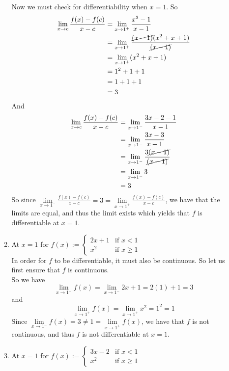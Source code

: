 \documentclass[12pt,letterpaper]{article}
\theoremstyle{case}
\theoremstyle{definition}
\begin{document}
\begin{enumerate}
\begin{enumerate}
			Now we must check for differentiability when $x=1$. So
			\begin{align*}
				\lim\limits_{x \to c} \frac{f(x)-f(c)}{x-c} &= \lim\limits_{x \to 1^+} \frac{x^3-1}{x-1} \\
				&= \lim\limits_{x \to 1^+} \frac{\cancel{(x-1)}(x^2+x+1)}{\cancel{(x-1)}} \\
				&= \lim\limits_{x \to 1^+} (x^2+x+1) \\
				&= 1^2+1+1 \\
				&= 1 + 1 + 1 \\
				&= 3
			\end{align*}
			And
			\begin{align*}
				\lim\limits_{x \to c} \frac{f(x)-f(c)}{x-c} &= \lim\limits_{x \to 1^-} \frac{3x-2-1}{x-1} \\
				&= \lim\limits_{x \to 1^-} \frac{3x-3}{x-1} \\
				&= \lim\limits_{x \to 1^-} \frac{3\cancel{(x-1)}}{\cancel{(x-1)}} \\
				&= \lim\limits_{x \to 1^-} 3 \\
				&= 3
			\end{align*}
			So since $\lim\limits_{x \to 1^-} \frac{f(x)-f(c)}{x-c} = 3 = \lim\limits_{x \to 1^+} \frac{f(x)-f(c)}{x-c}$, we have that the limits are equal, and thus the limit exists which yields that $f$ is differentiable at $x=1$.\\
			\item At $x=1$ for $f(x):=\begin{cases}
				2x+1 &\text{if } x < 1 \\
				x^2 &\text{if } x \geq 1
			\end{cases}$\\
			
			In order for $f$ to be differentiable, it must also be continuous. So let us first ensure that $f$ is continuous.\\
			
			So we have
			\[\lim\limits_{x \to 1^-} f(x)=\lim\limits_{x \to 1^-} 2x+1 =2(1)+1=3\]
			and
			\[\lim\limits_{x \to 1^+} f(x)=\lim\limits_{x \to 1^+} x^2 = 1^2=1\]
			Since $\lim\limits_{x \to 1^-} f(x) = 3 \neq 1 = \lim\limits_{x \to 1^+} f(x)$, we have that $f$ is not continuous, and thus $f$ is not differentiable at $x=1$.\\
			\item At $x=1$ for $f(x):=\begin{cases}
				3x-2 &\text{if } x<1 \\
				x^2 &\text{if } x \geq 1
			\end{cases}$\\
			

\end{enumerate}
\end{enumerate}
\end{document}
